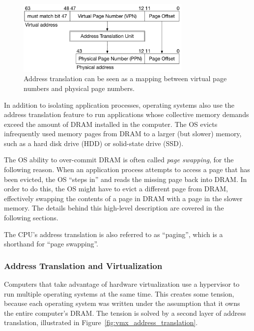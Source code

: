 \begin{figure}[hbt]
  \centering
  \includegraphics[width=85mm]{figures/address_translation_bits.pdf}
  \caption{
    Address translation can be seen as a mapping between virtual page numbers
    and physical page numbers.
  }
  \label{fig:address_translation_bits}
\end{figure}

In addition to isolating application processes, operating systems also use the
address translation feature to run applications whose collective memory
demands exceed the amount of DRAM installed in the computer. The OS evicts
infrequently used memory pages from DRAM to a larger (but slower) memory, such
as a hard disk drive (HDD) or solid-state drive (SSD).

The OS ability to over-commit DRAM is often called \textit{page swapping}, for
the following reason. When an application process attempts to access a page
that has been evicted, the OS ``steps in'' and reads the missing page back into
DRAM. In order to do this, the OS might have to evict a different page from
DRAM, effectively swapping the contents of a page in DRAM with a page in the
slower memory. The details behind this high-level description are covered in
the following sections.

The CPU's address translation is also referred to as ``paging'', which is a
shorthand for ``page swapping''.


\subsubsection{Address Translation and Virtualization}
\label{sec:vmx_paging}


Computers that take advantage of hardware virtualization use a hypervisor to
run multiple operating systems at the same time. This creates some tension,
because each operating system was written under the assumption that it owns the
entire computer's DRAM. The tension is solved by a second layer of address
translation, illustrated in Figure~\ref{fig:vmx_address_translation}.

